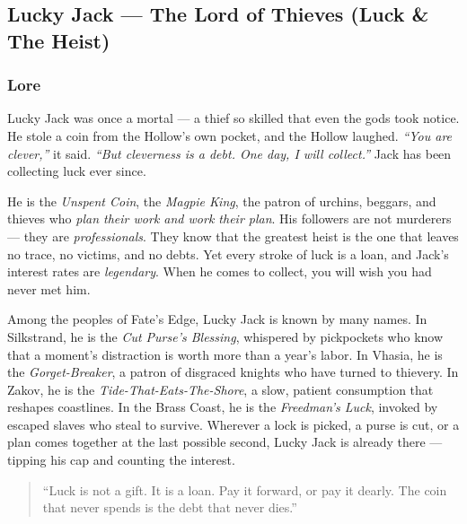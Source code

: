 
\subsection{Lucky Jack --- The Lord of Thieves (Luck \& The Heist)}

\subsubsection*{Lore}
Lucky Jack was once a mortal --- a thief so skilled that even the gods took notice. He stole a coin from the Hollow's own pocket, and the Hollow laughed. \textit{``You are clever,''} it said. \textit{``But cleverness is a debt. One day, I will collect.''} Jack has been collecting luck ever since.

He is the \textit{Unspent Coin}, the \textit{Magpie King}, the patron of urchins, beggars, and thieves who \textit{plan their work and work their plan}. His followers are not murderers --- they are \textit{professionals}. They know that the greatest heist is the one that leaves no trace, no victims, and no debts. Yet every stroke of luck is a loan, and Jack's interest rates are \textit{legendary}. When he comes to collect, you will wish you had never met him.

Among the peoples of Fate's Edge, Lucky Jack is known by many names. In Silkstrand, he is the \textit{Cut Purse's Blessing}, whispered by pickpockets who know that a moment's distraction is worth more than a year's labor. In Vhasia, he is the \textit{Gorget-Breaker}, a patron of disgraced knights who have turned to thievery. In Zakov, he is the \textit{Tide-That-Eats-The-Shore}, a slow, patient consumption that reshapes coastlines. In the Brass Coast, he is the \textit{Freedman's Luck}, invoked by escaped slaves who steal to survive. Wherever a lock is picked, a purse is cut, or a plan comes together at the last possible second, Lucky Jack is already there --- tipping his cap and counting the interest.

\begin{quote}
``Luck is not a gift. It is a loan. Pay it forward, or pay it dearly. The coin that never spends is the debt that never dies.''
\end{quote}

